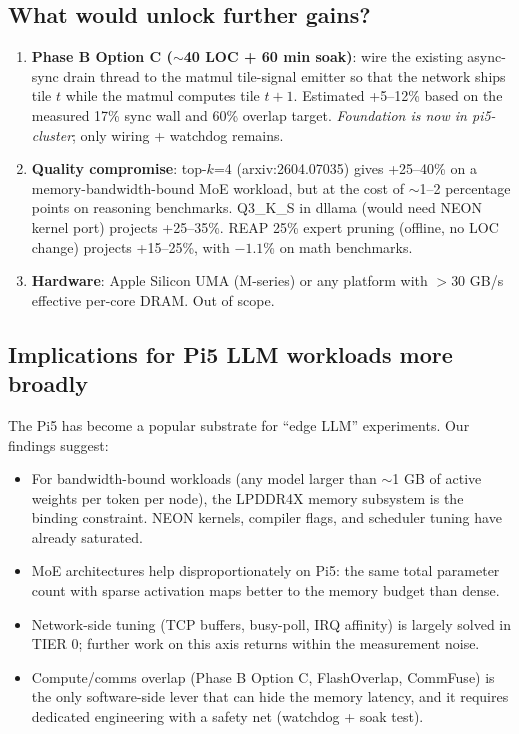 \documentclass[10pt,a4paper]{article}
\begin{document}
\subsection{What would unlock further gains?}

\begin{enumerate}[leftmargin=*,nosep]
  \item \textbf{Phase B Option C ($\sim$40 LOC + 60 min soak)}: wire the existing async-sync drain thread to the matmul tile-signal emitter so that the network ships tile $t$ while the matmul computes tile $t+1$. Estimated +5--12\% based on the measured 17\% sync wall and 60\% overlap target. \emph{Foundation is now in pi5-cluster}; only wiring + watchdog remains.
  \item \textbf{Quality compromise}: top-$k$=4 (arxiv:2604.07035) gives +25--40\% on a memory-bandwidth-bound MoE workload, but at the cost of $\sim$1--2 percentage points on reasoning benchmarks. Q3\_K\_S in dllama (would need NEON kernel port) projects +25--35\%. REAP 25\% expert pruning (offline, no LOC change) projects +15--25\%, with $-1.1$\% on math benchmarks.
  \item \textbf{Hardware}: Apple Silicon UMA (M-series) or any platform with $>$30 GB/s effective per-core DRAM. Out of scope.
\end{enumerate}

\subsection{Implications for Pi5 LLM workloads more broadly}

The Pi5 has become a popular substrate for ``edge LLM'' experiments. Our findings suggest:

\begin{itemize}[leftmargin=*,nosep]
  \item For bandwidth-bound workloads (any model larger than $\sim$1 GB of active weights per token per node), the LPDDR4X memory subsystem is the binding constraint. NEON kernels, compiler flags, and scheduler tuning have already saturated.
  \item MoE architectures help disproportionately on Pi5: the same total parameter count with sparse activation maps better to the memory budget than dense.
  \item Network-side tuning (TCP buffers, busy-poll, IRQ affinity) is largely solved in TIER 0; further work on this axis returns within the measurement noise.
  \item Compute/comms overlap (Phase B Option C, FlashOverlap, CommFuse) is the only software-side lever that can hide the memory latency, and it requires dedicated engineering with a safety net (watchdog + soak test).
\end{itemize}
\end{document}
